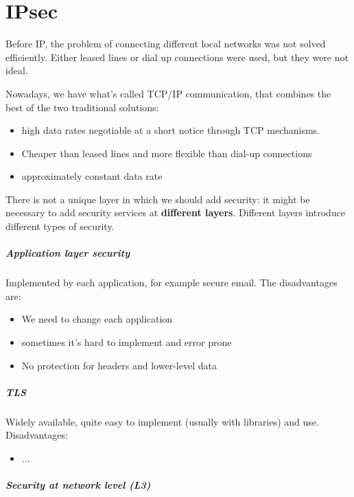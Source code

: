 \chapter[]{IPsec}

Before IP, the problem of connecting different local networks was not solved efficiently. Either leased lines or dial up connections were used, but they were not ideal.

Nowadays, we have what's called TCP/IP communication, that combines the best of the two traditional solutions:
\begin{itemize}
    \item high data rates negotiable at a short notice through TCP mechanisms.
    \item Cheaper than leased lines and more flexible than dial-up connections
    \item approximately constant data rate
\end{itemize}

There is not a unique layer in which we should add security: it might be necessary to add security services at \textbf{different layers}. Different layers introduce different types of security.

\paragraph{Application layer security}
Implemented by each application, for example secure email. The disadvantages are:
\begin{itemize}
    \item We need to change each application
    \item sometimes it's hard to implement and error prone
    \item No protection for headers and lower-level data
\end{itemize}

\paragraph{TLS}
Widely available, quite easy to implement (usually with libraries) and use. Disadvantages:
\begin{itemize}
    \item ...
\end{itemize}

\paragraph{Security at network level (L3)}

